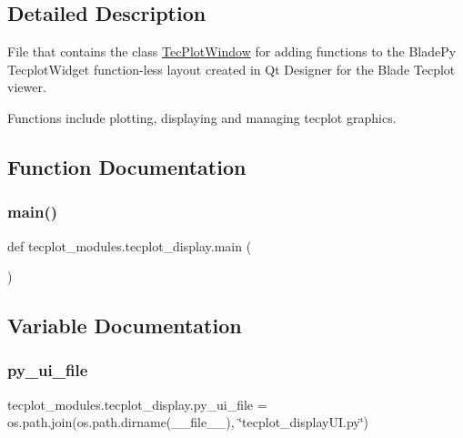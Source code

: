 \subsection{Detailed Description}
File that contains the class \hyperlink{classtecplot__modules_1_1tecplot__display_1_1_tec_plot_window}{Tec\+Plot\+Window} for adding functions to the Blade\+Py Tecplot\+Widget function-\/less layout created in Qt Designer for the Blade Tecplot viewer. 

Functions include plotting, displaying and managing tecplot graphics. 

\subsection{Function Documentation}
\hypertarget{namespacetecplot__modules_1_1tecplot__display_ae84aaefe646aaa295bfdc9a3046a660f}{}\label{namespacetecplot__modules_1_1tecplot__display_ae84aaefe646aaa295bfdc9a3046a660f} 
\subsubsection{\texorpdfstring{main()}{main()}}
{\footnotesize\ttfamily def tecplot\+\_\+modules.\+tecplot\+\_\+display.\+main (\begin{DoxyParamCaption}{ }\end{DoxyParamCaption})}



\subsection{Variable Documentation}
\hypertarget{namespacetecplot__modules_1_1tecplot__display_a4ac8bfff686ecfec8b20653a09a9acc3}{}\label{namespacetecplot__modules_1_1tecplot__display_a4ac8bfff686ecfec8b20653a09a9acc3} 
\subsubsection{\texorpdfstring{py\+\_\+ui\+\_\+file}{py\_ui\_file}}
{\footnotesize\ttfamily tecplot\+\_\+modules.\+tecplot\+\_\+display.\+py\+\_\+ui\+\_\+file = os.\+path.\+join(os.\+path.\+dirname(\+\_\+\+\_\+file\+\_\+\+\_\+), \char`\"{}tecplot\+\_\+display\+U\+I.\+py\char`\"{})}

